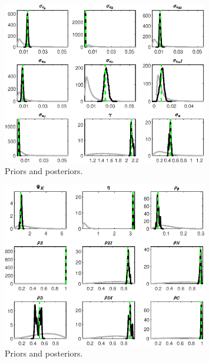  
\begin{figure}[H]
\centering
\includegraphics[width=0.80\textwidth]{BRS_pred_labor/Output/BRS_pred_labor_PriorsAndPosteriors1}
\caption{Priors and posteriors.}\label{Fig:PriorsAndPosteriors:1}
\end{figure}
 
\begin{figure}[H]
\centering
\includegraphics[width=0.80\textwidth]{BRS_pred_labor/Output/BRS_pred_labor_PriorsAndPosteriors2}
\caption{Priors and posteriors.}\label{Fig:PriorsAndPosteriors:2}
\end{figure}
 
